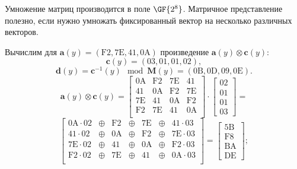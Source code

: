 Умножение матриц производится в поле $\GF{2^8}$. Матричное представление полезно, если нужно умножать фиксированный вектор на несколько различных векторов.

\example
Вычислим для $\mathbf{a}(y) = (\mathrm{F2}, \mathrm{7E}, \mathrm{41}, \mathrm{0A})$ произведение $\mathbf{a}(y) \otimes \mathbf{c}(y)$:
\[
    \mathbf{c}(y) = (03, 01, 01, 02),
\] \[
    \mathbf{d}(y) = \mathbf{c}^{-1}(y) \mod \mathbf{M}(y) = (\mathrm{0B}, \mathrm{0D}, \mathrm{09}, \mathrm{0E}).
\] \[
    \mathbf{a}(y) \otimes \mathbf{c}(y) =
    \left[ \begin{array}{cccc}
        \mathrm{0A} & \mathrm{F2} & \mathrm{7E} & \mathrm{41} \\
        \mathrm{41} & \mathrm{0A} & \mathrm{F2} & \mathrm{7E} \\
        \mathrm{7E} & \mathrm{41} & \mathrm{0A} & \mathrm{F2} \\
        \mathrm{F2} & \mathrm{7E} & \mathrm{41} & \mathrm{0A} \\
    \end{array} \right] \cdot
    \left[ \begin{array}{c} \mathrm{02} \\ \mathrm{01} \\ \mathrm{01} \\ \mathrm{03} \end{array} \right] =
\] \[
    \left[ \begin{array}{ccccccc}
        \mathrm{0A} \cdot \mathrm{02} & \oplus & \mathrm{F2} & \oplus & \mathrm{7E} & \oplus & \mathrm{41} \cdot \mathrm{03} \\
        \mathrm{41} \cdot \mathrm{02} & \oplus & \mathrm{0A} & \oplus & \mathrm{F2} & \oplus & \mathrm{7E} \cdot \mathrm{03} \\
        \mathrm{7E} \cdot \mathrm{02} & \oplus & \mathrm{41} & \oplus & \mathrm{0A} & \oplus & \mathrm{F2} \cdot \mathrm{03} \\
        \mathrm{F2} \cdot \mathrm{02} & \oplus & \mathrm{7E} & \oplus & \mathrm{41} & \oplus & \mathrm{0A} \cdot \mathrm{03} \\
    \end{array} \right] =
    \left[ \begin{array}{c} \mathrm{5B} \\ \mathrm{F8} \\ \mathrm{BA} \\ \mathrm{DE} \end{array} \right];
\] \[
    \begin{array}{l}

\end{array}\]
